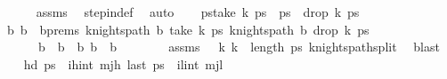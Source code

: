 \begin{isabellebody}
\ \ \ \ \isamarkupfalse%
\ assms\ \isamarkupfalse%
\ step{\isacharunderscore}{\kern0pt}in{\isacharunderscore}{\kern0pt}def\ \isamarkupfalse%
\ auto\isanewline
\ \ \isamarkupfalse%
\ {\isacharquery}{\kern0pt}ps{\isacharequal}{\kern0pt}{\isachardoublequoteopen}{\isacharparenleft}{\kern0pt}take\ k\ ps\ {\isacharat}{\kern0pt}\ {\isacharquery}{\kern0pt}ps\ {\isacharat}{\kern0pt}\ {\isacharparenleft}{\kern0pt}drop\ k\ ps\isanewline
\ \ \isamarkupfalse%
\ b\ b\ \ b{\isacharunderscore}{\kern0pt}prems{\isacharcolon}{\kern0pt}\ {\isachardoublequoteopen}knights{\isacharunderscore}{\kern0pt}path\ b\ {\isacharparenleft}{\kern0pt}take\ k\ ps\ {\isachardoublequoteopen}knights{\isacharunderscore}{\kern0pt}path\ b\ {\isacharparenleft}{\kern0pt}drop\ k\ ps\ \isanewline
\ \ \ \ \ \ {\isachardoublequoteopen}b\ {\isasymunion}\ b\ {\isacharequal}{\kern0pt}\ {\isacharquery}{\kern0pt}b\ {\isachardoublequoteopen}b\ {\isasyminter}\ b\ {\isacharequal}{\kern0pt}\ {\isacharbraceleft}{\kern0pt}{\isacharbraceright}{\kern0pt}{\isachardoublequoteclose}\isanewline
\ \ \ \ \isamarkupfalse%
\ assms\ {\isacartoucheopen}{}\ {\isacharless}{\kern0pt}\ k{\isacartoucheclose}\ {\isacartoucheopen}k\ {\isacharless}{\kern0pt}\ length\ ps\ knights{\isacharunderscore}{\kern0pt}path{\isacharunderscore}{\kern0pt}split\ \isamarkupfalse%
\ blast\isanewline
\isanewline
\ \ \isamarkupfalse%
\ {\isachardoublequoteopen}hd\ {\isacharquery}{\kern0pt}ps\ {\isacharequal}{\kern0pt}\ {\isacharparenleft}{\kern0pt}i\isactrlsub h{\isacharcomma}{\kern0pt}int\ mj\isactrlsub h{\isacharparenright}{\kern0pt}{\isachardoublequoteclose}\ {\isachardoublequoteopen}last\ {\isacharquery}{\kern0pt}ps\ {\isacharequal}{\kern0pt}\ {\isacharparenleft}{\kern0pt}i\isactrlsub l{\isacharcomma}{\kern0pt}int\ mj\isactrlsub l{\isacharparenright}{\kern0pt}{\isachardoublequoteclose}\isanewline

\end{isabellebody}
